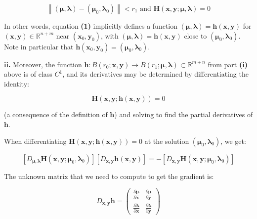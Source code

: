 \documentclass{tex/note}
\begin{document}
\begin{equation}
\left\lVert \left( \bm{\mu} , \bm{\lambda} \right) - \left( \bm{\mu}_0 , \bm{\lambda}_0 \right) \right\rVert < r_1 \text{ and } \bm{H} \left( \bm{x} , \bm{y} ; \bm{\mu} , \bm{\lambda} \right) = 0
\end{equation}

In other words, equation \textbf{(1)} implicitly defines a function $\left( \bm{\mu} , \bm{\lambda} \right) = \bm{h} \left( \bm{x} , \bm{y} \right)$ for $\left( \bm{x} , \bm{y} \right) \in \mathbb{R}^{n + m}$ near $\left( \bm{x}_0 , \bm{y}_0 \right)$, with $\left( \bm{\mu} , \bm{\lambda} \right) = \bm{h} \left( \bm{x} , \bm{y} \right)$ close to $\left( \bm{\mu}_0 , \bm{\lambda}_0 \right)$. Note in particular that $\bm{h} \left( \bm{x}_0 , \bm{y}_0 \right) = \left( \bm{\mu}_0 , \bm{\lambda}_0 \right)$.

\textbf{ii.} Moreover, the function $\bm{h} : B \left( r _0 ; \bm{x} , \bm{y} \right) \rightarrow B \left( r_1 ; \bm{\mu} , \bm{\lambda} \right) \subset \mathbb{R}^{m + n}$
from part \textbf{(i)} above is of class $C^1$, and its derivatives may be determined by differentiating the identity:

\begin{equation*}
\bm{H} \left( \bm{x} , \bm{y} ; \bm{h} \left( \bm{x} , \bm{y} \right) \right) = 0
\end{equation*}

(a consequence of the definition of $\bm{h}$) and solving to find the partial derivatives of $\bm{h}$.

When differentiating $\bm{H} \left( \bm{x} , \bm{y} ; \bm{h} \left( \bm{x} , \bm{y} \right) \right) = 0$ at the solution $\left( \bm{\mu}_0 , \bm{\lambda}_0 \right)$, we get:

\begin{equation*}
\left[ D_{\bm{\mu} , \bm{\lambda}} \bm{H} \left( \bm{x} , \bm{y} ; \bm{\mu}_0 , \bm{\lambda}_0 \right) \right] \left[ D_{\bm{x} , \bm{y}} \bm{h} \left( \bm{x} , \bm{y} \right) \right] = - \left[ D_{\bm{x} , \bm{y}} \bm{H} \left( \bm{x} , \bm{y} ; \bm{\mu}_0 , \bm{\lambda}_0 \right) \right]
\end{equation*}

The unknown matrix that we need to compute to get the gradient is:

\begin{equation*}
D_{\bm{x} , \bm{y}} \bm{h} = \begin{pmatrix} \frac{\partial \bm{\mu}}{\partial \bm{x}} & \frac{\partial \bm{\mu}}{\partial \bm{y}} \\ \frac{\partial \bm{\lambda}}{\partial \bm{x}} & \frac{\partial \bm{\lambda}}{\partial \bm{y}} \end{pmatrix}
\end{equation*}
\end{document}
